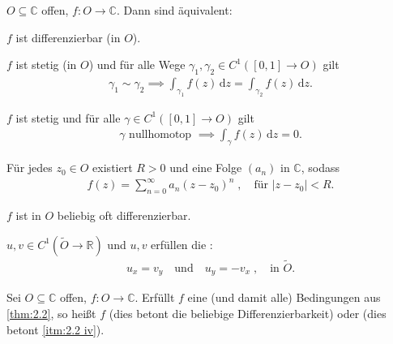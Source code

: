 \begin{theorem}[Satz] \label{thm:2.2}
  $O \subseteq \mathbb{C}$ offen, $f : O \to \mathbb{C}$. Dann sind äquivalent:
  \begin{enum-roman}
    \item \label{itm:2.2 i} $f$ ist differenzierbar (in $O$).
    
    \item \label{itm:2.2 ii} $f$ ist stetig (in $O$) und für alle Wege $\gamma_1, \gamma_2 \in C^1([0,1] \to O)$ gilt
    \begin{align*}
      \gamma_1 \sim \gamma_2 \implies \int_{\gamma_1} f(z) \, \mathrm{d}z = \int_{\gamma_2} f(z) \, \mathrm{d}z.
    \end{align*}
    
    \item \label{itm:2.2 iii} $f$ ist stetig und für alle $\gamma \in C^1([0,1] \to O)$ gilt
    \begin{align*}
      \gamma \text{ nullhomotop } \implies \int_\gamma f(z) \, \mathrm{d}z = 0.
    \end{align*}
    
    \item \label{itm:2.2 iv} Für jedes $z_0 \in O$ existiert $R > 0$ und eine Folge $(a_n)$ in $\mathbb{C}$, sodass
    \begin{align*}
      f(z) = \sum\limits_{n=0}^{\infty} a_n (z-z_0)^n \; , \quad \text{für } |z-z_0| < R.
    \end{align*}
    
    \item \label{itm:2.2 v} $f$ ist in $O$ beliebig oft differenzierbar.
    
    \item \label{itm:2.2 vi} $u, v \in C^1(\widetilde{O} \to \mathbb{R})$ und $u, v$ erfüllen die :
    \begin{align*}
      u_x = v_y \quad \text{und} \quad u_y = -v_x \; , \quad \text{in } \widetilde{O}.
    \end{align*}
  \end{enum-roman}
\end{theorem}

\begin{theorem}[Definition]
  Sei $O \subseteq \mathbb{C}$ offen, $f : O \to \mathbb{C}$. Erfüllt $f$ eine (und damit alle) Bedingungen aus \ref{thm:2.2}, so heißt $f$  (dies betont die beliebige Differenzierbarkeit) oder  (dies betont \ref{itm:2.2 iv}).
\end{theorem}

